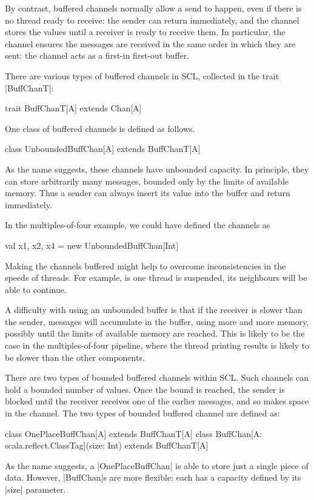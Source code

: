 By contrast, buffered channels normally allow a send to happen, even if there
is no thread ready to receive: the sender can return immediately, and the
channel stores the values until a receiver is ready to receive them.  In
particular, the channel ensures the messages are received in the same order in
which they are sent: the channel acts as a first-in first-out buffer.

There are various types of buffered channels in SCL, collected in the trait
|BuffChanT|: 
\begin{scala}
trait BuffChanT[A] extends Chan[A]
\end{scala}
%
One class of buffered channels is defined as follows. 
%
\begin{scala}
class UnboundedBuffChan[A] extends BuffChanT[A]
\end{scala}
%
As the name suggests, these channels have unbounded capacity. In principle,
they can store arbitrarily many messages, bounded only by the limits of
available memory.  Thus a sender can always insert its value into the buffer
and return immediately. 

In the multiples-of-four example, we could have defined the channels as 
%
\begin{scala}
  val x1, x2, x4 = new UnboundedBuffChan[Int]
\end{scala}
%
Making the channels buffered might help to overcome inconsistencies in the
speeds of threads.  For example, is one thread is suspended, its neighbours
will be able to continue.

A difficulty with using an unbounded buffer is that if the receiver is slower
than the sender, messages will accumulate in the buffer, using more and more
memory, possibly until the limits of available memory are reached.  This is
likely to be the case in the multiples-of-four pipeline, where the thread
printing results is likely to be slower than the other components. 

There are two types of bounded buffered channels within SCL.  Such channels
can hold a bounded number of values.  Once the bound is reached, the sender is
blocked until the receiver receives one of the earlier messages, and so makes
space in the channel.
%
The two types of bounded buffered channel are defined as:
%
\begin{scala}
class OnePlaceBuffChan[A] extends BuffChanT[A]
class BuffChan[A: scala.reflect.ClassTag](size: Int) extends BuffChanT[A]
\end{scala}
%
As the name suggests, a |OnePlaceBuffChan| is able to store just a single
piece of data.  However, |BuffChan|s are more flexible: each has a capacity
defined by its |size| parameter.

